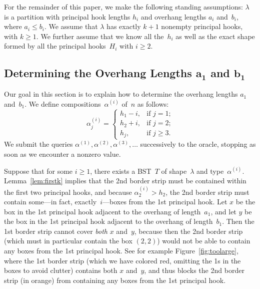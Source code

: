 \documentclass[12pt]{article}
\theoremstyle{definition}
\begin{document}
For the remainder of this paper, we make the 
following standing assumptions: $\lambda$ is a partition
with principal hook lengths $h_i$
and overhang lengths $a_i$ and~$b_i$, where $a_i\le b_i$.
We assume that $\lambda$ has exactly $k+1$ nonempty principal hooks,
with $k\ge 1$.
We further assume that we know all the~$h_i$
as well as the exact shape formed by
all the principal hooks~$H_i$ with $i\ge 2$.

\subsection{Determining the Overhang Lengths
\texorpdfstring{$\bm{a_1}$}{a1}
and \texorpdfstring{$\bm{b_1}$}{b1}}
\label{sec:overhang}


Our goal in this section is to explain how to determine
the overhang lengths $a_1$ and~$b_1$.
We define compositions~$\alpha^{(i)}$ of~$n$ as follows:
\begin{equation*}
\alpha_j^{(i)} = 
\begin{cases}
h_1 - i, &\mbox{if $j=1$;} \\
h_2 + i, &\mbox{if $j=2$;} \\
h_j,     &\mbox{if $j\ge3$.}
\end{cases}
\end{equation*}
We submit the queries
$\alpha^{(1)}, \alpha^{(2)}, \alpha^{(3)}, \ldots$
successively to the oracle,
stopping as soon as we encounter a nonzero value.


Suppose that for some $i\ge 1$, there exists a BST~$T$
of shape~$\lambda$ and type~$\alpha^{(i)}$.
Lemma~\ref{lem:firstk} implies that the 2nd border strip
must be contained within the first two principal hooks,
and because $\alpha^{(i)}_2 > h_2$,
the 2nd border strip must contain some---in fact,
exactly~$i$---boxes from the 1st principal hook.
Let $x$ be the box in the 1st principal hook
adjacent to the overhang of length~$a_1$,
and let $y$ be the box in the 1st principal hook
adjacent to the overhang of length~$b_1$.
Then the 1st border strip cannot cover \emph{both}
$x$ and~$y$, because then the 2nd border strip
(which must in particular contain the box $(2,2)$)
would not be able to contain any boxes from the 1st principal hook.
See for example Figure~\ref{fig:toolarge},
where the 1st border strip
(which we have colored red,
omitting the 1s in the boxes to avoid clutter)
contains both $x$ and~$y$, and thus blocks
the 2nd border strip (in orange) from containing any boxes from
the 1st principal hook.
\end{document}
